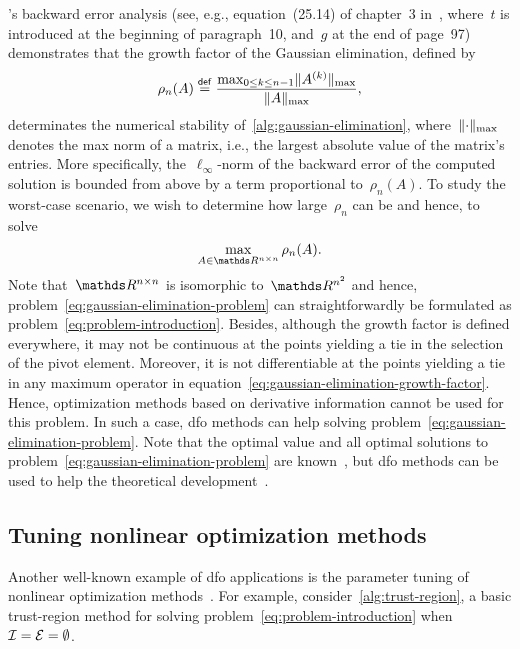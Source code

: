 's backward error analysis (see, e.g., equation~(25.14) of chapter~3 in~\cite{Wilkinson_1963}, where~$t$ is introduced at the beginning of paragraph~10, and~$g$ at the end of page~97) demonstrates that the growth factor of the Gaussian elimination, defined by
\begin{equation}
    \label{eq:gaussian-elimination-growth-factor}
    \rho_n(A) \mathrel{\stackrel{\mathsf{def}}{=}} \frac{\max_{0 \le k \le n - 1} \lVert A^{(k)}\rVert_{\max}}{\lVert A\rVert_{\max}},
\end{equation}
determinates the numerical stability of~\cref{alg:gaussian-elimination}, where~$\lVert\cdot\rVert_{\max}$ denotes the max norm of a matrix, i.e., the largest absolute value of the matrix's entries.
More specifically, the~$\ell_{\infty}$-norm of the backward error of the computed solution is bounded from above by a term proportional to~$\rho_n(A)$.
To study the worst-case scenario, we wish to determine how large~$\rho_n$ can be and hence, to solve
\begin{equation}
    \label{eq:gaussian-elimination-problem}
    \max_{A \in \R^{n \times n}} \rho_n(A).
\end{equation}
Note that~$\R^{n \times n}$ is isomorphic to~$\R^{n^2}$ and hence, problem~\cref{eq:gaussian-elimination-problem} can straightforwardly be formulated as problem~\cref{eq:problem-introduction}.
Besides, although the growth factor is defined everywhere, it may not be continuous at the points yielding a tie in the selection of the pivot element.
Moreover, it is not differentiable at the points yielding a tie in any maximum operator in equation~\cref{eq:gaussian-elimination-growth-factor}.
Hence, optimization methods based on derivative information cannot be used for this problem.
In such a case, \gls{dfo} methods can help solving problem~\cref{eq:gaussian-elimination-problem}.
Note that the optimal value and all optimal solutions to problem~\cref{eq:gaussian-elimination-problem} are known~\cite{Higham_Higham_1989}, but \gls{dfo} methods can be used to help the theoretical development~\cite{Higham_1993}.

\subsection{Tuning nonlinear optimization methods}

Another well-known example of \gls{dfo} applications is the parameter tuning of nonlinear optimization methods~\cite{Audet_Orban_2006}.
For example, consider~\cref{alg:trust-region}, a basic trust-region method for solving problem~\cref{eq:problem-introduction} when~$\mathcal{I} = \mathcal{E} = \emptyset$.

